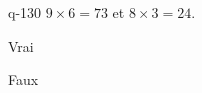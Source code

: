 \begin{truefalse}{q-130}
$9\times 6 = 73$ et $8\times 3 = 24$.
\item Vrai
\item* Faux
\end{truefalse}

